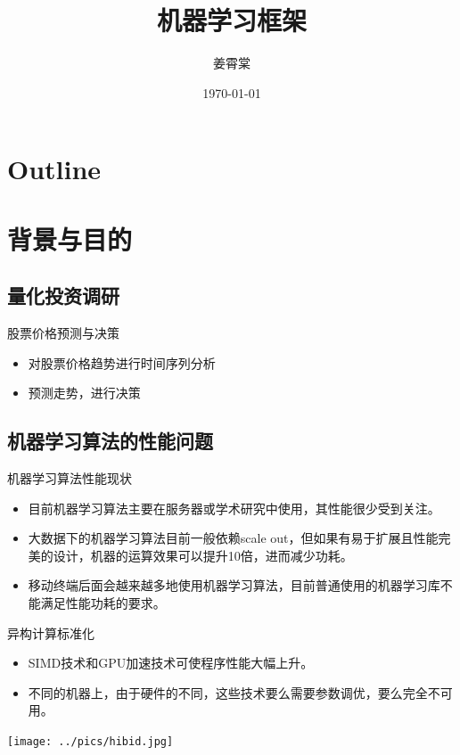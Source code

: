 \documentclass{beamer}
\title{机器学习框架}
\author{姜霄棠}
\date{\today}
\begin{document}
\begin{frame}
\titlepage
\end{frame}
\section*{Outline}
\begin{frame}
\tableofcontents
\end{frame}
\section{背景与目的}
\subsection{量化投资调研}
\begin{frame}{股票价格预测与决策}
\begin{itemize}
\item 对股票价格趋势进行时间序列分析
\item 预测走势，进行决策
\end{itemize}
\end{frame}
\subsection{机器学习算法的性能问题}
\begin{frame}{机器学习算法性能现状}
\begin{itemize}
\item 目前机器学习算法主要在服务器或学术研究中使用，其性能很少受到关注。
\item 大数据下的机器学习算法目前一般依赖scale out，但如果有易于扩展且性能完美的设计，机器的运算效果可以提升10倍，进而减少功耗。
\item 移动终端后面会越来越多地使用机器学习算法，目前普通使用的机器学习库不能满足性能功耗的要求。
\end{itemize}
\end{frame}

\begin{frame}{异构计算标准化}
\begin{itemize}
\item SIMD技术和GPU加速技术可使程序性能大幅上升。
\item 不同的机器上，由于硬件的不同，这些技术要么需要参数调优，要么完全不可用。
\end{itemize}
\texttt{[image: ../pics/hibid.jpg]}
\end{frame}
\end{document}
